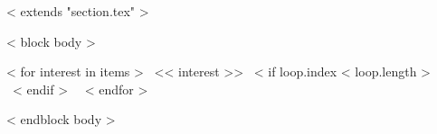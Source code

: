 ~< extends "section.tex" >~

~< block body >~


    ~< for interest in items >~
        << interest >> ~< if loop.index < loop.length >~ \textbullet \ ~< endif >~       
    ~< endfor >~
 
~< endblock body >~
